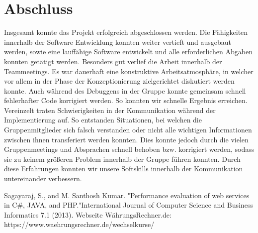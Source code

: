 \documentclass[conference]{IEEEtran}
\begin{document}
\section{Abschluss}
Insgesamt konnte das Projekt erfolgreich abgeschlossen werden. Die Fähigkeiten innerhalb der Software Entwicklung konnten weiter vertieft und ausgebaut werden, sowie eine lauffähige Software entwickelt und alle erforderlichen Abgaben konnten getätigt werden.
Besonders gut verlief die Arbeit innerhalb der Teammeetings. Es war dauerhaft eine konstruktive Arbeitsatmosphäre, in welcher vor allem in der Phase der Konzeptionierung zielgerichtet diskutiert werden konnte. Auch während des Debuggens in der Gruppe konnte gemeinsam schnell fehlerhafter Code korrigiert werden. So konnten wir schnelle Ergebnis erreichen. \\
Vereinzelt traten Schwierigkeiten in der Kommunikation während der Implementierung auf. So entstanden Situationen, bei welchen die Gruppenmitglieder sich falsch verstanden oder nicht alle wichtigen Informationen zwischen ihnen transferiert werden konnten. Dies konnte jedoch durch die vielen Gruppenmeetings und Absprachen schnell behoben bzw. korrigiert werden, sodass sie zu keinem größeren Problem innerhalb der Gruppe führen konnten. Durch diese Erfahrungen konnten wir unsere Softskills innerhalb der Kommunikation untereinander verbessern.

\begin{thebibliography}{99}
	Sagayaraj, S., and M. Santhosh Kumar. "Performance evaluation of web services in C\#, JAVA, and PHP."\space International Journal of Computer Science and Business Informatics 7.1 (2013).
	Webseite WährungsRechner.de: \\https://www.waehrungsrechner.de/wechselkurse/
\end{thebibliography}
\end{document}
